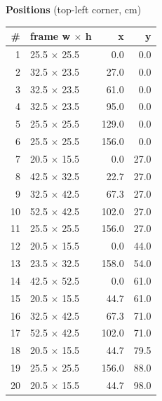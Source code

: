 \documentclass[a4paper,landscape,10pt]{article}
\begin{document}
\begin{minipage}[t]{0.25\textwidth}
\vspace{8pt}
{\bfseries Positions} (top-left corner, cm)\\[2pt]
\tiny
\begin{tabular}{@{}r l r r@{}}
\toprule
\# & frame w $\times$ h & x & y \\
\midrule
1 & 25.5 $\times$ 25.5 & 0.0 & 0.0 \\
2 & 32.5 $\times$ 23.5 & 27.0 & 0.0 \\
3 & 32.5 $\times$ 23.5 & 61.0 & 0.0 \\
4 & 32.5 $\times$ 23.5 & 95.0 & 0.0 \\
5 & 25.5 $\times$ 25.5 & 129.0 & 0.0 \\
6 & 25.5 $\times$ 25.5 & 156.0 & 0.0 \\
7 & 20.5 $\times$ 15.5 & 0.0 & 27.0 \\
8 & 42.5 $\times$ 32.5 & 22.7 & 27.0 \\
9 & 32.5 $\times$ 42.5 & 67.3 & 27.0 \\
10 & 52.5 $\times$ 42.5 & 102.0 & 27.0 \\
11 & 25.5 $\times$ 25.5 & 156.0 & 27.0 \\
12 & 20.5 $\times$ 15.5 & 0.0 & 44.0 \\
13 & 23.5 $\times$ 32.5 & 158.0 & 54.0 \\
14 & 42.5 $\times$ 52.5 & 0.0 & 61.0 \\
15 & 20.5 $\times$ 15.5 & 44.7 & 61.0 \\
16 & 32.5 $\times$ 42.5 & 67.3 & 71.0 \\
17 & 52.5 $\times$ 42.5 & 102.0 & 71.0 \\
18 & 20.5 $\times$ 15.5 & 44.7 & 79.5 \\
19 & 25.5 $\times$ 25.5 & 156.0 & 88.0 \\
20 & 20.5 $\times$ 15.5 & 44.7 & 98.0 \\
\bottomrule
\end{tabular}
\end{minipage}
\clearpage
\end{document}
